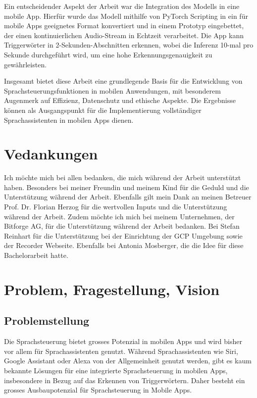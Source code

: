 \documentclass[11pt,a4paper]{article}
\begin{document}
\noindent \newline
Ein entscheidender Aspekt der Arbeit war die Integration des Modells in eine mobile App. Hierfür wurde 
das Modell mithilfe von PyTorch Scripting in ein für mobile Apps geeignetes Format konvertiert und 
in einem Prototyp eingebettet, der einen kontinuierlichen Audio-Stream in Echtzeit verarbeitet. Die 
App kann Triggerwörter in 2-Sekunden-Abschnitten erkennen, wobei die Inferenz 10-mal pro 
Sekunde durchgeführt wird, um eine hohe Erkennungsgenauigkeit zu gewährleisten.

\noindent \newline
Insgesamt bietet diese Arbeit eine grundlegende Basis für die Entwicklung von 
Sprachsteuerungsfunktionen in mobilen Anwendungen, mit besonderem Augenmerk auf Effizienz, 
Datenschutz und ethische Aspekte. Die Ergebnisse können als Ausgangspunkt für die Implementierung 
vollständiger Sprachassistenten in mobilen Apps dienen.


\section*{Vedankungen}
Ich möchte mich bei allen bedanken, die mich während der Arbeit unterstützt haben. Besonders bei 
meiner Freundin und meinem Kind für die Geduld und die Unterstützung während der Arbeit. Ebenfalls 
gilt mein Dank an meinen Betreuer Prof. Dr. Florian Herzog für die wertvollen Inputs und die 
Unterstützung während der Arbeit. Zudem möchte ich mich bei meinem Unternehmen, der Bitforge AG, 
für die Unterstützung während der Arbeit bedanken. Bei Stefan Reinhart für die Unterstützung bei 
der Einrichtung der GCP Umgebung sowie der Recorder Webseite. Ebenfalls bei Antonia 
Mosberger, die die Idee für diese Bachelorarbeit hatte.


\newpage
{}
\tableofcontents
{}
\newpage


\newpage \section{Problem, Fragestellung, Vision}
\subsection{Problemstellung}
Die Sprachsteuerung bietet grosses Potenzial in mobilen Apps und wird bisher vor allem für 
Sprachassistenten genutzt. Während Sprachassistenten wie Siri, Google Assistant oder Alexa 
von der Allgemeinheit genutzt werden, gibt es kaum bekannte Lösungen für eine integrierte Sprachsteuerung in mobilen Apps, insbesondere in 
Bezug auf das Erkennen von Triggerwörtern. Daher besteht ein grosses Ausbaupotenzial für 
Sprachsteuerung in Mobile Apps. 
\end{document}
